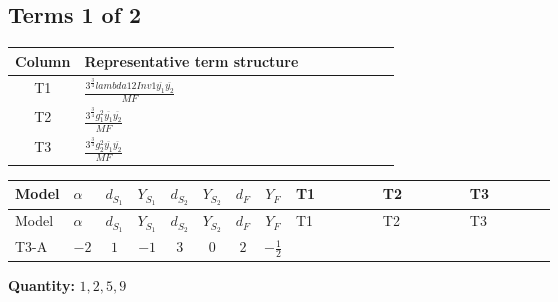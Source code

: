 \documentclass[8pt]{article}
\begin{document}
\begin{landscape}
\subsection*{Terms 1 of 2}
\begin{center}
\begin{tabular}{@{}c >{\raggedright\arraybackslash}p{0.82\linewidth}@{}}
\toprule
Column & Representative term structure \\
\midrule
T1 & \(\displaystyle \frac{3^{\frac{3}{4}} lambda12Inv1 \overline{y_{1}} \overline{y_{2}}}{MF}\) \\
\midrule
T2 & \(\displaystyle \frac{3^{\frac{3}{4}} g_{1}^{2} \overline{y_{1}} \overline{y_{2}}}{MF}\) \\
\midrule
T3 & \(\displaystyle \frac{3^{\frac{3}{4}} g_{2}^{2} \overline{y_{1}} \overline{y_{2}}}{MF}\) \\
\midrule
\bottomrule
\end{tabular}
\end{center}
\smallskip
\tiny
\begin{longtable}{@{}llcccccc >{\raggedright\arraybackslash}p{0.21\linewidth} >{\raggedright\arraybackslash}p{0.21\linewidth} >{\raggedright\arraybackslash}p{0.21\linewidth}@{}}
\toprule
Model & $\alpha$ & $d_{S_1}$ & $Y_{S_1}$ & $d_{S_2}$ & $Y_{S_2}$ & $d_F$ & $Y_F$ & T1 & T2 & T3 \\
\midrule
\endfirsthead
\toprule
Model & $\alpha$ & $d_{S_1}$ & $Y_{S_1}$ & $d_{S_2}$ & $Y_{S_2}$ & $d_F$ & $Y_F$ & T1 & T2 & T3 \\
\midrule
\endhead
T3-A & $-2$ & $1$ & $-1$ & $3$ & $0$ & $2$ & $-\frac{1}{2}$ & \scriptsize\adjustbox{max width=\linewidth}{$\begin{gathered} \frac{3^{\frac{3}{4}} lambda12Inv1 \overline{y_{1}} \overline{y_{2}}}{6 MF}\end{gathered}$} & \scriptsize\adjustbox{max width=\linewidth}{$\begin{gathered} \frac{3^{\frac{3}{4}} g_{1}^{2} \overline{y_{1}} \overline{y_{2}}}{8 MF}\end{gathered}$} & \scriptsize\adjustbox{max width=\linewidth}{$\begin{gathered} \frac{25 \cdot 3^{\frac{3}{4}} g_{2}^{2} \overline{y_{1}} \overline{y_{2}}}{24 MF}\end{gathered}$} \\
\midrule
\bottomrule
\end{longtable}
\clearpage
\noindent\textbf{Quantity: }$\mathrm{1,2,5,9}$\par\smallskip

\end{landscape}
\end{document}

